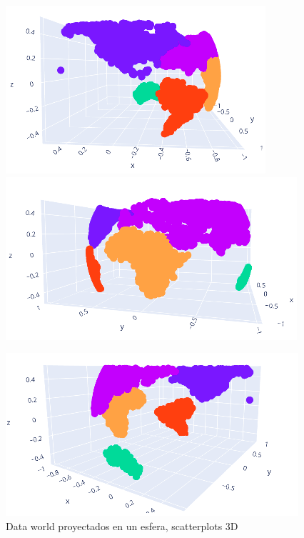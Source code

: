 \documentclass[paper=letter, fontsize=11pt]{scrartcl}
\numberwithin{equation}{section} %
\numberwithin{figure}{section} %
\numberwithin{table}{section} %
\begin{document}
\begin{figure}[!htb]
  \includegraphics[width=\linewidth]{figure/3D_world1.png}
\endminipage\hfill
{}
  \includegraphics[width=\linewidth]{figure/3D_world2.png}
\endminipage
\end{figure}
\begin{figure}[H]
    \centering
    \includegraphics[scale=0.5]{figure/3D_world3.png}
    \caption{Data world proyectados en un esfera, scatterplots 3D}
    \label{fig:3D_world3}
\end{figure}
\end{document}
